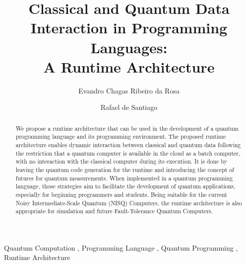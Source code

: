 \documentclass[preprint,3p,times,twocolumn]{elsarticle}
\begin{document}
\begin{frontmatter}

\title{Classical and Quantum Data Interaction in Programming Languages: \\ A Runtime Architecture}       

\author{Evandro Chagas Ribeiro da Rosa}
\author{Rafael de Santiago}

\address{Departamento de Informática e Estatística - INE PPGCC \\
         Universidade Federal de Santa Catarina - UFSC \\
         Florianópolis, Santa Catarina, Brazil}

\begin{abstract}
    We propose a runtime architecture that can be used in the development of a
    quantum programming language and its programming environment. The proposed
    runtime architecture enables dynamic interaction between classical and
    quantum data following the restriction that a quantum computer is available
    in the cloud as a batch computer, with no interaction with the classical
    computer during its execution. It is done by leaving the quantum code
    generation for the runtime and introducing the concept of futures for
    quantum measurements. When implemented in a quantum programming language,
    those strategies aim to facilitate the development of quantum applications,
    especially for beginning programmers and students.  Being suitable for the
    current Noisy Intermediate-Scale Quantum (NISQ) Computers, the runtime
    architecture is also appropriate for simulation and future Fault-Tolerance
    Quantum Computers.  
\end{abstract}


\begin{keyword}
    Quantum Computation \sep
    Programming Language \sep 
    Quantum Programming \sep
    Runtime Architecture


\end{keyword}

\end{frontmatter}
\end{document}
